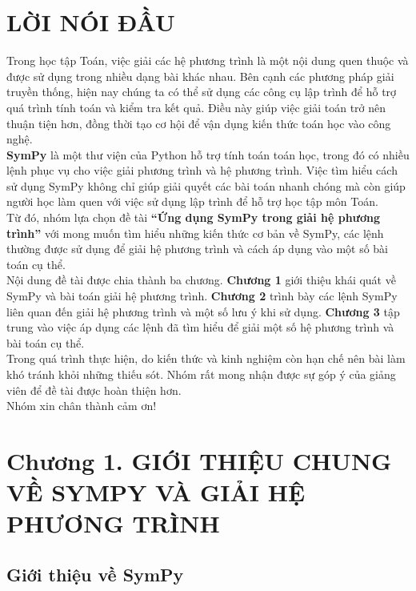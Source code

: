 \documentclass[13pt,a4paper]{article}
\begin{document}
\section*{LỜI NÓI ĐẦU}
Trong học tập Toán, việc giải các hệ phương trình là một nội dung quen thuộc và được sử dụng trong nhiều dạng bài khác nhau. Bên cạnh các phương pháp giải truyền thống, hiện nay chúng ta có thể sử dụng các công cụ lập trình để hỗ trợ quá trình tính toán và kiểm tra kết quả. Điều này giúp việc giải toán trở nên thuận tiện hơn, đồng thời tạo cơ hội để vận dụng kiến thức toán học vào công nghệ.\\
\noindent \textbf{SymPy} là một thư viện của Python hỗ trợ tính toán toán học, trong đó có nhiều lệnh phục vụ cho việc giải phương trình và hệ phương trình. Việc tìm hiểu cách sử dụng SymPy không chỉ giúp giải quyết các bài toán nhanh chóng mà còn giúp người học làm quen với việc sử dụng lập trình để hỗ trợ học tập môn Toán.\\
\noindent Từ đó, nhóm lựa chọn đề tài \textbf{“Ứng dụng SymPy trong giải hệ phương trình”} với mong muốn tìm hiểu những kiến thức cơ bản về SymPy, các lệnh thường được sử dụng để giải hệ phương trình và cách áp dụng vào một số bài toán cụ thể.\\
\noindent Nội dung đề tài được chia thành ba chương. \textbf{Chương 1} giới thiệu khái quát về SymPy và bài toán giải hệ phương trình. \textbf{Chương 2} trình bày các lệnh SymPy liên quan đến giải hệ phương trình và một số lưu ý khi sử dụng. \textbf{Chương 3} tập trung vào việc áp dụng các lệnh đã tìm hiểu để giải một số hệ phương trình và bài toán cụ thể.\\
\noindent Trong quá trình thực hiện, do kiến thức và kinh nghiệm còn hạn chế nên bài làm khó tránh khỏi những thiếu sót. Nhóm rất mong nhận được sự góp ý của giảng viên để đề tài được hoàn thiện hơn.\\
\noindent Nhóm xin chân thành cảm ơn!
\newpage
\section{Chương 1. GIỚI THIỆU CHUNG VỀ SYMPY VÀ GIẢI HỆ PHƯƠNG TRÌNH}
\subsection{Giới thiệu về SymPy}
\end{document}
